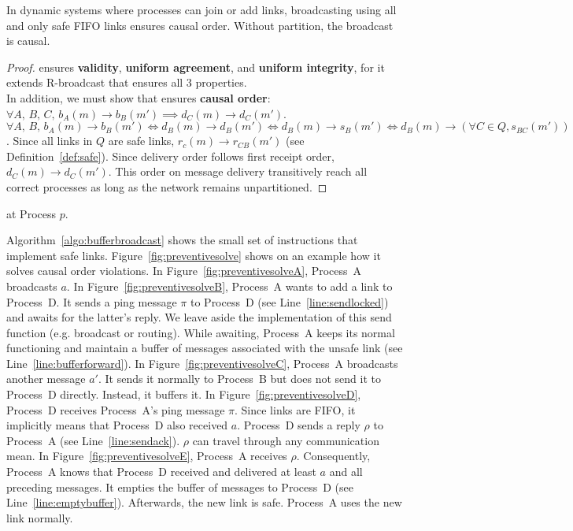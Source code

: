 \begin{lemma}
  In dynamic systems where processes can join or add links, broadcasting using
  all and only safe FIFO links ensures causal order. Without partition, the
  broadcast is causal.
\end{lemma}

\begin{proof}
  \CBROADCAST ensures \textbf{validity}, \textbf{uniform agreement}, and
  \textbf{uniform integrity},
  for it extends R-broadcast that ensures all 3 properties. \\
  In addition, we must show that \CBROADCAST ensures \textbf{causal order}:
  $\forall A,\,B,\,C,\, b_A(m) \rightarrow b_B(m')
  \implies d_C(m) \rightarrow d_C(m')$. \\
  $\forall A,\,B,\, b_A(m) \rightarrow b_B(m') \Leftrightarrow d_B(m)
  \rightarrow d_B(m') \Leftrightarrow d_B(m) \rightarrow s_B(m') \Leftrightarrow
  d_B(m) \rightarrow (\forall C\in Q, s_{BC}(m'))$.
  Since all links in $Q$ are safe links, $r_c(m) \rightarrow r_{CB}(m')$ (see
  Definition~\ref{def:safe}).  Since delivery order follows first receipt order,
  $d_C(m) \rightarrow d_C(m')$. This order on message delivery transitively
  reach all correct processes as long as the network remains unpartitioned.
\end{proof}



\begin{algorithm}[h]
  
  \caption{\label{algo:bufferbroadcast}\CBROADCAST at Process $p$.}
\end{algorithm}


Algorithm~\ref{algo:bufferbroadcast} shows the small set of instructions that
implement safe links.  Figure~\ref{fig:preventivesolve} shows on an example how
it solves causal order violations. In Figure~\ref{fig:preventivesolveA},
Process~A broadcasts $a$.  In Figure~\ref{fig:preventivesolveB}, Process~A wants
to add a link to Process~D. It sends a ping message $\pi$ to Process~D (see
Line~\ref{line:sendlocked}) and awaits for the latter's reply.  We leave aside
the implementation of this send function (e.g. broadcast or routing).  While
awaiting, Process~A keeps its normal functioning and maintain a buffer of
messages associated with the unsafe link (see Line~\ref{line:bufferforward}). In
Figure~\ref{fig:preventivesolveC}, Process~A broadcasts another message $a'$. It
sends it normally to Process~B but does not send it to Process~D
directly. Instead, it buffers it. In Figure~\ref{fig:preventivesolveD},
Process~D receives Process~A's ping message $\pi$. Since links are FIFO, it
implicitly means that Process~D also received $a$. Process~D sends a reply
$\rho$ to Process~A (see Line~\ref{line:sendack}). $\rho$ can travel through any
communication mean. In Figure~\ref{fig:preventivesolveE}, Process~A receives
$\rho$. Consequently, Process~A knows that Process~D received and delivered at
least $a$ and all preceding messages. It empties the buffer of messages to
Process~D (see Line~\ref{line:emptybuffer}). Afterwards, the new link is
safe. Process~A uses the new link normally.

